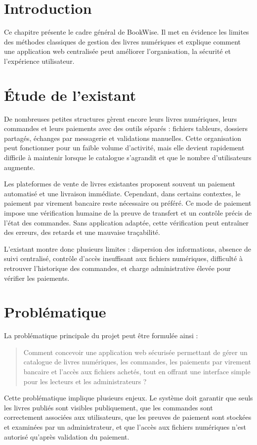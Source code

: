\documentclass[12pt,a4paper]{report}
\newcommand{\chapterintro}[1]{
    \section*{Introduction}
    \vspace{-0.5em}
    \addcontentsline{toc}{section}{Introduction}
    #1
}
\begin{document}
\chapterintro{
Ce chapitre présente le cadre général de BookWise. Il met en évidence les limites des méthodes classiques de gestion des livres numériques et explique comment une application web centralisée peut améliorer l'organisation, la sécurité et l'expérience utilisateur.
}

\newpage
\section{Étude de l'existant}

De nombreuses petites structures gèrent encore leurs livres numériques, leurs commandes et leurs paiements avec des outils séparés : fichiers tableurs, dossiers partagés, échanges par messagerie et validations manuelles. Cette organisation peut fonctionner pour un faible volume d'activité, mais elle devient rapidement difficile à maintenir lorsque le catalogue s'agrandit et que le nombre d'utilisateurs augmente.

Les plateformes de vente de livres existantes proposent souvent un paiement automatisé et une livraison immédiate. Cependant, dans certains contextes, le paiement par virement bancaire reste nécessaire ou préféré. Ce mode de paiement impose une vérification humaine de la preuve de transfert et un contrôle précis de l'état des commandes. Sans application adaptée, cette vérification peut entraîner des erreurs, des retards et une mauvaise traçabilité.

L'existant montre donc plusieurs limites : dispersion des informations, absence de suivi centralisé, contrôle d'accès insuffisant aux fichiers numériques, difficulté à retrouver l'historique des commandes, et charge administrative élevée pour vérifier les paiements.

\section{Problématique}

La problématique principale du projet peut être formulée ainsi :

\begin{quote}
Comment concevoir une application web sécurisée permettant de gérer un catalogue de livres numériques, les commandes, les paiements par virement bancaire et l'accès aux fichiers achetés, tout en offrant une interface simple pour les lecteurs et les administrateurs ?
\end{quote}

Cette problématique implique plusieurs enjeux. Le système doit garantir que seuls les livres publiés sont visibles publiquement, que les commandes sont correctement associées aux utilisateurs, que les preuves de paiement sont stockées et examinées par un administrateur, et que l'accès aux fichiers numériques n'est autorisé qu'après validation du paiement.
\end{document}
